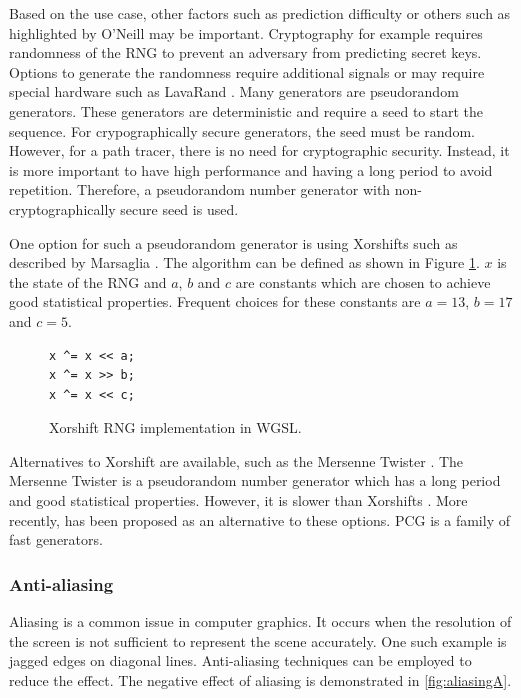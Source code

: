 Based on the use case, other factors such as prediction difficulty or others such as highlighted by O’Neill \cite{o2014pcg} may be important. Cryptography for example requires randomness of the \gls{RNG} to prevent an adversary from predicting secret keys. Options to generate the randomness require additional signals \cite{randomnessCryptography} or may require special hardware such as LavaRand \cite{cloudflareLavaRand}. Many generators are pseudorandom generators. These generators are deterministic and require a seed to start the sequence. For crypographically secure generators, the seed must be random.
However, for a path tracer, there is no need for cryptographic security. Instead, it is more important to have high performance and having a long period to avoid repetition. Therefore, a pseudorandom number generator with non-cryptographically secure seed is used.

One option for such a pseudorandom generator is using Xorshifts such as described by Marsaglia \cite{marsaglia2003xorshift}. The algorithm can be defined as shown in Figure \ref{code:xorShift}. $x$ is the state of the \gls{RNG} and $a$, $b$ and $c$ are constants which are chosen to achieve good statistical properties. Frequent choices for these constants are $a = 13$, $b = 17$ and $c = 5$.

\begin{figure}[H]
\begin{lstlisting}[style=wgsl]
x ^= x << a;
x ^= x >> b;
x ^= x << c;
\end{lstlisting}
\caption{Xorshift \gls{RNG} implementation in \gls{WGSL}.}
\label{code:xorShift}
\end{figure}

Alternatives to Xorshift are available, such as the Mersenne Twister \cite{rngMersenneTwister}. The Mersenne Twister is a pseudorandom number generator which has a long period and good statistical properties. However, it is slower than Xorshifts \cite{o2014pcg}. More recently,  has been proposed as an alternative to these options. \gls{PCG} is a family of fast generators.

\subsubsection{Anti-aliasing}
\label{sec:anti-aliasing}

Aliasing is a common issue in computer graphics. It occurs when the resolution of the screen is not sufficient to represent the scene accurately. One such example is jagged edges on diagonal lines. Anti-aliasing techniques can be employed to reduce the effect. The negative effect of aliasing is demonstrated in \autoref{fig:aliasingA}.

